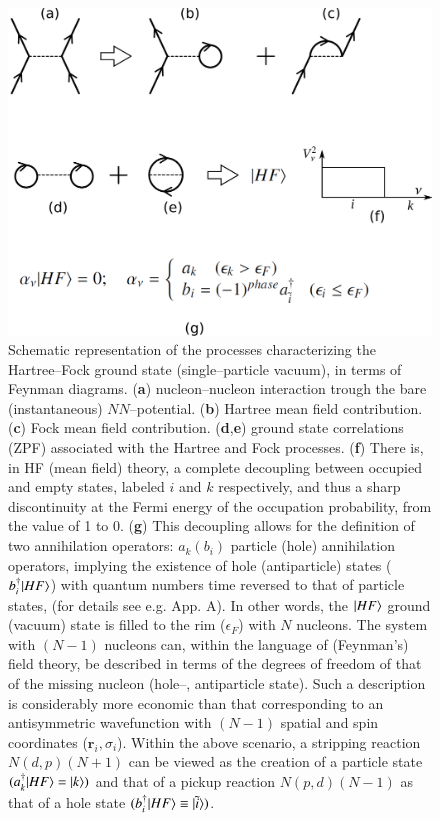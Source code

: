 \begin{figure}[h!]
\centerline {
\includegraphics*[width=12cm]{introduccion/figs/figintro4}
}
\caption{Schematic representation of the processes characterizing the Hartree--Fock ground state (single--particle vacuum), in terms of Feynman diagrams. (\textbf{a}) nucleon--nucleon interaction trough the bare (instantaneous) $NN$--potential. (\textbf{b}) Hartree mean field contribution. (\textbf{c}) Fock mean field contribution. (\textbf{d},\textbf{e}) ground state correlations (ZPF) associated with the Hartree and Fock processes. (\textbf{f}) There is, in HF (mean field) theory, a complete decoupling between occupied and empty states, labeled $i$ and $k$ respectively, and thus a sharp discontinuity at the Fermi energy of the occupation probability, from the value of 1 to 0. (\textbf{g}) This decoupling allows for the definition of two annihilation operators: $a_k(b_i)$ particle (hole) annihilation operators,   implying the existence of hole (antiparticle) states ($b^\dagger_i|{HF} \rangle$) with quantum numbers time reversed to that of particle states, (for details see e.g. \cite{Brink:05} App. A). In other words, the $|{HF} \rangle$ ground (vacuum) state is filled to the rim ($\epsilon_F$) with $N$ nucleons. The system with $(N-1)$ nucleons can, within the language of (Feynman's) field theory, be described in terms of the degrees of freedom of that of the missing nucleon (hole--, antiparticle state). Such a description is  considerably more economic than that corresponding to an antisymmetric wavefunction with $(N-1)$ spatial and spin coordinates ($\mathbf r_i,\sigma_i$). Within the above scenario, a stripping reaction $N(d,p)(N+1)$ can be viewed as the creation of a particle state $(a^\dagger_k|{HF} \rangle=|{k} \rangle)$ and that of a pickup reaction $N(p,d)(N-1)$ as that of a hole state $(b^\dagger_i|{HF} \rangle\equiv|{\tilde i} \rangle)$.}
\label{figintro4}
\end{figure}

